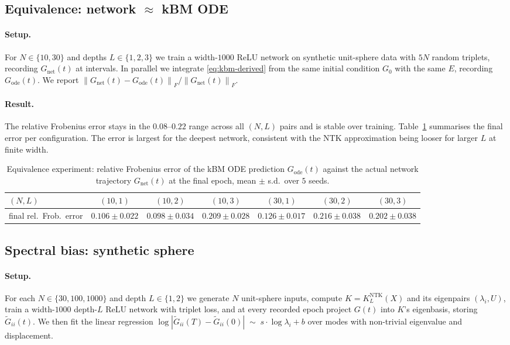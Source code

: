 \documentclass[11pt]{article}
\theoremstyle{definition}
\theoremstyle{plain}
\newcommand{\norm}[1]{\left\lVert#1\right\rVert}
\begin{document}
\subsection{Equivalence: network $\approx$ kBM ODE}
\label{sec:equiv}

\paragraph{Setup.}
For $N\in\{10,30\}$ and depths $L\in\{1,2,3\}$ we train a width-$1000$ ReLU
network on synthetic unit-sphere data with $5N$ random triplets, recording
$G_{\mathrm{net}}(t)$ at intervals. In parallel we integrate
\eqref{eq:kbm-derived} from the same initial condition $G_0$ with the same
$E$, recording $G_{\mathrm{ode}}(t)$. We report
$\norm{G_{\mathrm{net}}(t)-G_{\mathrm{ode}}(t)}_F/\norm{G_{\mathrm{net}}(t)}_F$.

\paragraph{Result.}
The relative Frobenius error stays in the $0.08$--$0.22$ range across all
$(N,L)$ pairs and is stable over training. Table~\ref{tab:equivalence}
summarises the final error per configuration. The error is largest for the
deepest network, consistent with the NTK approximation being looser for
larger $L$ at finite width.

\begin{table}[h]
\centering
\begin{tabular}{lcccccc}
\toprule
$(N,L)$ & $(10,1)$ & $(10,2)$ & $(10,3)$ & $(30,1)$ & $(30,2)$ & $(30,3)$ \\
\midrule
final rel.\ Frob.\ error & $0.106\pm0.022$ & $0.098\pm0.034$ & $0.209\pm0.028$ & $0.126\pm0.017$ & $0.216\pm0.038$ & $0.202\pm0.038$ \\
\bottomrule
\end{tabular}
\caption{Equivalence experiment: relative Frobenius error of the kBM ODE
prediction $G_{\mathrm{ode}}(t)$ against the actual network trajectory
$G_{\mathrm{net}}(t)$ at the final epoch, mean $\pm$ s.d.\ over $5$ seeds.}
\label{tab:equivalence}
\end{table}

\subsection{Spectral bias: synthetic sphere}
\label{sec:synth-spectral}

\paragraph{Setup.}
For each $N\in\{30,100,1000\}$ and depth $L\in\{1,2\}$ we generate $N$
unit-sphere inputs, compute $K=K_L^{\mathrm{NTK}}(X)$ and its eigenpairs
$(\lambda_i,U)$, train a width-$1000$ depth-$L$ ReLU network with triplet
loss, and at every recorded epoch project $G(t)$ into $K$'s eigenbasis,
storing $\widetilde G_{ii}(t)$. We then fit the linear regression
$\log|\widetilde G_{ii}(T)-\widetilde G_{ii}(0)|\;\sim\;s\cdot\log\lambda_i+b$
over modes with non-trivial eigenvalue and displacement.
\end{document}
